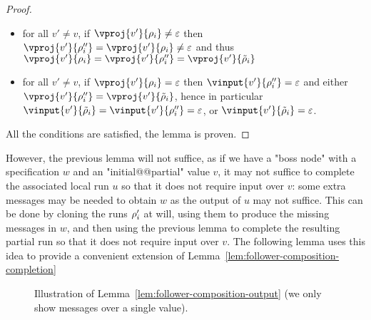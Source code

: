\begin{proof}
\begin{itemize}
		\item for all $v' \neq v$, if $\vproj{v'}{\run_i} \neq \epsilon$ then $\vproj{v'}{\run''_i} = \vproj{v'}{\run_i} \neq \epsilon$ and thus $\vproj{v'}{\run_i} = \vproj{v'}{\run''_i} = \vproj{v'}{\Tilde{\run}_i}$
		
		\item for all $v' \neq v$, if $\vproj{v'}{\run_i} = \epsilon$ then $\vinput{v'}{\run''_i} = \epsilon$ and either $\vproj{v'}{\run''_i} = \vproj{v'}{\Tilde{\run}_i}$, hence in particular $\vinput{v'}{\Tilde{\run}_i} = \vinput{v'}{\run''_i} = \epsilon$, or $\vinput{v'}{\Tilde{\run}_i} = \epsilon$.
	\end{itemize}

All the conditions are satisfied, the lemma is proven.
\end{proof}

However, the previous lemma will not suffice, as if we have a "boss node" with a specification $w$ and an "initial@@partial" value $v$, it may not suffice to complete the associated local run $u$ so that it does not require input over $v$: some extra messages may be needed to obtain $w$ as the output of $u$ may not suffice. This can be done by cloning the runs $\rho_i'$ at will, using them to produce the missing messages in $w$, and then using the previous lemma to complete the resulting partial run so that it does not require input over $v$. The following lemma uses this idea to provide a convenient extension of Lemma~\ref{lem:follower-composition-completion} 

\begin{figure}
	
	\caption{Illustration of Lemma~\ref{lem:follower-composition-output} (we only show messages over a single value).}
	\label{fig:tree-to-run}
\end{figure}


